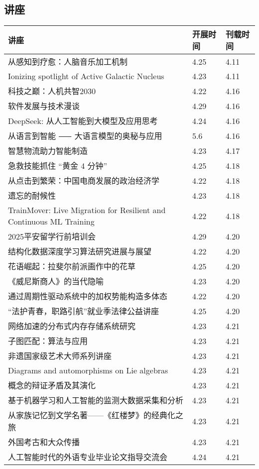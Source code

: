 \documentclass[letterpaper, 12pt]{article}
\begin{document}
\begin{multicols}{2}
\pagebreak

\section{讲座}
\begin{tabular}{|>{\centering\arraybackslash}m{}|m{}|m{}|}
    \hline
    讲座 & 开展时间 & 刊载时间\\
    \hline\hline
    从感知到疗愈：人脑音乐加工机制 & 4.25 & 4.11\\\hline
    Ionizing spotlight of Active Galactic Nucleus & 4.23 & 4.11\\\hline
    科技之巅：人机共智2030 & 4.22 & 4.16\\\hline
    软件发展与技术漫谈 & 4.29 & 4.16\\\hline
    DeepSeek: 从人工智能到大模型及应用思考 & 4.24 & 4.16\\\hline
    从语言到智能 ⸺ 大语言模型的奥秘与应用 & 5.6 & 4.16\\\hline
    智慧物流助力智能制造 & 4.23 & 4.17\\\hline
    急救技能抓住 “黄金 4 分钟” & 4.25 & 4.18\\\hline
    从点击到繁荣：中国电商发展的政治经济学 & 4.22 & 4.18\\\hline
    遗忘的耐候性 & 4.23 & 4.18\\\hline
    TrainMover: Live Migration for Resilient and Continuous ML Training & 4.22 & 4.18\\\hline
    2025平安留学行前培训会 & 4.29 & 4.20\\\hline
    结构化数据深度学习算法研究进展与展望 & 4.22 & 4.20\\\hline
    花语崛起：拉斐尔前派画作中的花草 & 4.25 & 4.20\\\hline
    《威尼斯商人》的当代隐喻 & 4.23 & 4.20\\\hline
    通过周期性驱动系统中的加权势能构造多体态 & 4.22 & 4.20\\\hline
    “法护青春，职路引航”就业季法律公益讲座 & 4.25 & 4.20\\\hline
    网络加速的分布式内存存储系统研究 & 4.23 & 4.21\\\hline
    子图匹配：算法与应用 & 4.23 & 4.21\\\hline
    非遗国家级艺术大师系列讲座 & 4.23 & 4.21\\\hline
    Diagrams and automorphisms on Lie algebras & 4.23 & 4.21\\\hline
    概念的辩证矛盾及其演化 & 4.23 & 4.21\\\hline
    基于机器学习和人工智能的监测大数据采集和分析 & 4.23 & 4.21\\\hline
    从家族记忆到文学名著——《红楼梦》的经典化之旅 & 4.23 & 4.21\\\hline
    外国考古和大众传播 & 4.23 & 4.21\\\hline
        人工智能时代的外语专业毕业论文指导交流会 & 4.24 & 4.21\\\hline
\end{tabular}

\end{multicols}
\end{document}
